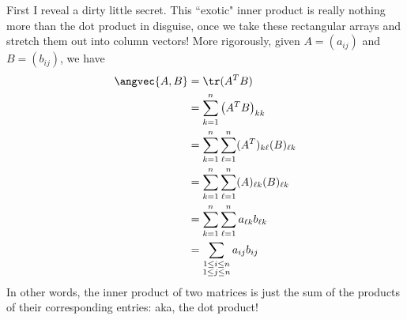 \ee
\begin{solution}
\noindent First I reveal a dirty little secret. This ``exotic"  inner product is really nothing more than the dot product in disguise, once we take these rectangular arrays and stretch them out into column vectors! More rigorously, given $A=(a_{ij})$ and $B=(b_{ij})$, we have 
\begin{align*}
\angvec{A,B}&=\tr(A^TB)\\
&=\sum_{k=1}^n \left(A^TB\right)_{kk}\\
&=\sum_{k=1}^n \sum_{\ell=1}^n (A^T)_{k\ell}(B)_{\ell k}\\
&=\sum_{k=1}^n \sum_{\ell=1}^n (A)_{\ell k}(B)_{\ell k}\\
&=\sum_{k=1}^n \sum_{\ell=1}^n a_{\ell k}b_{\ell k}\\
&=\sum_{\substack{1\leq i\leq n\\ 1\leq j\leq n}} a_{ij}b_{ij}
\end{align*}
In other words, the inner product of two matrices is just the sum of the products of their corresponding entries: aka, the dot product! 


\end{solution}
